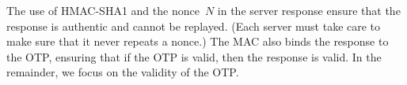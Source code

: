 The use of HMAC-SHA1 and the nonce~$N$ in the server response ensure that the
response is authentic and cannot be replayed. (Each server must take
care to make sure that it never repeats a nonce.) The MAC also binds the response
to the OTP, ensuring that if the OTP is valid, then the response is valid. In
the remainder, we focus on the validity of the OTP.

\newcommand{\forge}{\notionfont{FORGE}}
\newcommand{\sprp}{\notionfont{SPRP}}
\newcommand{\advF}{\algorithmfont{F}}
\newcommand{\advD}{\algorithmfont{D}}
\newcommand{\calK}{\mathcal{K}}
\newcommand{\calE}{\mathcal{E}}
\newcommand{\win}{\varfont{win}}
\newcommand{\KEYO}{\oraclefont{Key}}
\newcommand{\AUTHO}{\oraclefont{Auth}}
\newcommand{\Perm}{\mathrm{Perm}}
\newcommand{\Dom}{\mathrm{Dom}\,}
\newcommand{\Rng}{\mathrm{Rng}\,}
